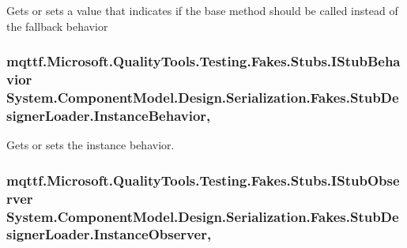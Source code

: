 Gets or sets a value that indicates if the base method should be called instead of the fallback behavior

\hypertarget{class_system_1_1_component_model_1_1_design_1_1_serialization_1_1_fakes_1_1_stub_designer_loader_ae34ea33e7e2fe9fbcd69e7e4b0250cb1}{
\subsubsection[{Instance\-Behavior}]{\setlength{\rightskip}{0pt plus 5cm}mqttf.\-Microsoft.\-Quality\-Tools.\-Testing.\-Fakes.\-Stubs.\-I\-Stub\-Behavior System.\-Component\-Model.\-Design.\-Serialization.\-Fakes.\-Stub\-Designer\-Loader.\-Instance\-Behavior\hspace{0.3cm}{\ttfamily [get]}, {\ttfamily [set]}}}\label{class_system_1_1_component_model_1_1_design_1_1_serialization_1_1_fakes_1_1_stub_designer_loader_ae34ea33e7e2fe9fbcd69e7e4b0250cb1}


Gets or sets the instance behavior.

\hypertarget{class_system_1_1_component_model_1_1_design_1_1_serialization_1_1_fakes_1_1_stub_designer_loader_a263a803f21f1b44a3b3580716c401691}{
\subsubsection[{Instance\-Observer}]{\setlength{\rightskip}{0pt plus 5cm}mqttf.\-Microsoft.\-Quality\-Tools.\-Testing.\-Fakes.\-Stubs.\-I\-Stub\-Observer System.\-Component\-Model.\-Design.\-Serialization.\-Fakes.\-Stub\-Designer\-Loader.\-Instance\-Observer\hspace{0.3cm}{\ttfamily [get]}, {\ttfamily [set]}}}\label{class_system_1_1_component_model_1_1_design_1_1_serialization_1_1_fakes_1_1_stub_designer_loader_a263a803f21f1b44a3b3580716c401691}


